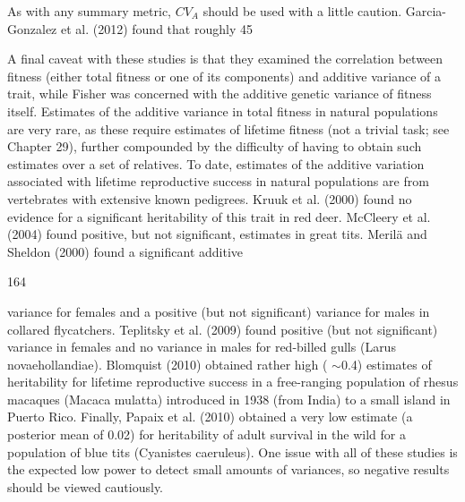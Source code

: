 \documentclass{article}
\begin{document}
As with any summary metric,  $ CV_A $ should be used with a little caution. Garcia-Gonzalez et al. (2012) found that roughly 45%

A final caveat with these studies is that they examined the correlation between fitness (either total fitness or one of its components) and additive variance of a trait, while Fisher was concerned with the additive genetic variance of fitness itself. Estimates of the additive variance in total fitness in natural populations are very rare, as these require estimates of lifetime fitness (not a trivial task; see Chapter 29), further compounded by the difficulty of having to obtain such estimates over a set of relatives. To date, estimates of the additive variation associated with lifetime reproductive success in natural populations are from vertebrates with extensive known pedigrees. Kruuk et al. (2000) found no evidence for a significant heritability of this trait in red deer. McCleery et al. (2004) found positive, but not significant, estimates in great tits. Merilä and Sheldon (2000) found a significant additive

164

variance for females and a positive (but not significant) variance for males in collared flycatchers. Teplitsky et al. (2009) found positive (but not significant) variance in females and no variance in males for red-billed gulls (Larus novaehollandiae). Blomquist (2010) obtained rather high ( $ \sim $0.4) estimates of heritability for lifetime reproductive success in a free-ranging population of rhesus macaques (Macaca mulatta) introduced in 1938 (from India) to a small island in Puerto Rico. Finally, Papaix et al. (2010) obtained a very low estimate (a posterior mean of 0.02) for heritability of adult survival in the wild for a population of blue tits (Cyanistes caeruleus). One issue with all of these studies is the expected low power to detect small amounts of variances, so negative results should be viewed cautiously.
\end{document}
